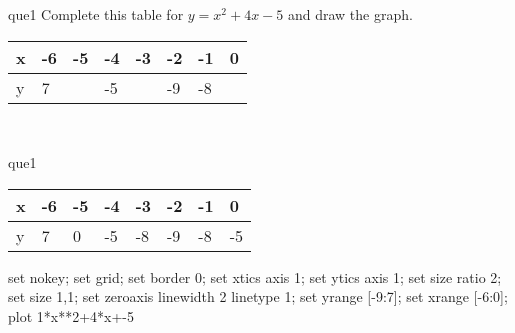 \documentclass[13.5pt, varwidth=true]{beamer}
\begin{document}
\begin{frame}[shrink=19,fragile]
	\begin{beamercolorbox}[rounded=true, left, shadow=true,wd=14.8cm]{que1}
		 Complete this table for $y = x^{2} + 4x - 5$ and draw the graph. \\[0.3cm] \renewcommand{\arraystretch}{1.2}\begin{tabular}{|C|C|C|C|C|C|C|C|} \hline x & -6 & -5 & -4 & -3 & -2 & -1 & 0 \\ \hline y & 7 &  & -5 &  & -9 & -8 & \\ \hline \end{tabular}\\[0.3cm]
	\end{beamercolorbox}
\end{frame}
\begin{frame}[shrink=19,fragile]
	\begin{beamercolorbox}[rounded=true, left, shadow=true,wd=14.8cm]{que1}
		\renewcommand{\arraystretch}{1.2}\begin{tabular}{|C|C|C|C|C|C|C|C|} \hline x & -6 & -5 & -4 & -3 & -2 & -1 & 0 \\ \hline y & 7 & 0 & -5 & -8 & -9 & -8 & -5\\ \hline \end{tabular}\begin{gnuplot}[terminal=pdf] set nokey; set grid; set border 0; set xtics axis 1; set ytics axis 1; set size ratio 2; set size 1,1; set zeroaxis linewidth 2 linetype 1; set yrange [-9:7]; set xrange [-6:0]; plot 1*x**2+4*x+-5 \end{gnuplot}
	\end{beamercolorbox}
\end{frame}
\end{document}
